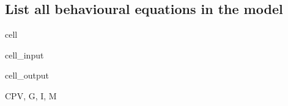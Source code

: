 \documentclass[letterpaper,10pt,english]{jupyterBook}
\begin{document}
\subsection{List all behavioural equations in the model}
\label{\detokenize{content/05_SimpleModel/SimpleModel:list-all-behavioural-equations-in-the-model}}
\begin{sphinxuseclass}{cell}\begin{sphinxVerbatimInput}

\begin{sphinxuseclass}{cell_input}
\begin{sphinxVerbatim}[commandchars=\\\{\}]
        \PYG{p}{[}\PYG{p}{]}\PYG{p}{[}\PYG{p}{]}   
\end{sphinxVerbatim}

\end{sphinxuseclass}\end{sphinxVerbatimInput}
\begin{sphinxVerbatimOutput}

\begin{sphinxuseclass}{cell_output}
\begin{sphinxVerbatim}[commandchars=\\\{\}]
\PYGZob{}\PYGZsq{}CPV\PYGZsq{}, \PYGZsq{}G\PYGZsq{}, \PYGZsq{}I\PYGZsq{}, \PYGZsq{}M\PYGZsq{}\PYGZcb{}
\end{sphinxVerbatim}

\end{sphinxuseclass}\end{sphinxVerbatimOutput}

\end{sphinxuseclass}
\end{document}
